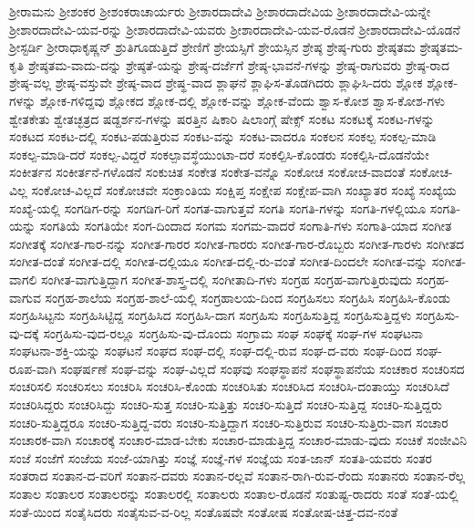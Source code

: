 {ಶ್ರೀರಾಮನು
ಶ್ರೀಶಂಕರ
ಶ್ರೀಶಂಕರಾಚಾರ್ಯರು
ಶ್ರೀಶಾರದಾದೇವಿ
ಶ್ರೀಶಾರದಾದೇವಿಯ
ಶ್ರೀಶಾರದಾದೇವಿ-ಯನ್ನೇ
ಶ್ರೀಶಾರದಾದೇವಿ-ಯವ-ರನ್ನು
ಶ್ರೀಶಾರದಾದೇವಿ-ಯವರು
ಶ್ರೀಶಾರದಾದೇವಿ-ಯವ-ರೊಡನೆ
ಶ್ರೀಶಾರದಾದೇವಿ-ಯೊಡನೆ
ಶ್ರೀಸ್ಟರ್ಡಿ
ಶ್ರೀರಾಧಾಕೃಷ್ಣನ್
ಶ್ರುತಿಗೂಡುತ್ತಿದೆ
ಶ್ರೇಣಿಗೆ
ಶ್ರೇಯಸ್ಸಿಗೆ
ಶ್ರೇಯಸ್ಸಿನ
ಶ್ರೇಷ್ಠ
ಶ್ರೇಷ್ಠ-ಗುರು
ಶ್ರೇಷ್ಠತಮ
ಶ್ರೇಷ್ಠತಮ-ಕೃತಿ
ಶ್ರೇಷ್ಠತಮ-ವಾದು-ದನ್ನು
ಶ್ರೇಷ್ಠತೆ-ಯನ್ನು
ಶ್ರೇಷ್ಠ-ದರ್ಜೆಗೆ
ಶ್ರೇಷ್ಠ-ಭಾವನೆ-ಗಳನ್ನು
ಶ್ರೇಷ್ಠ-ರಾಗುವರು
ಶ್ರೇಷ್ಠ-ರಾದ
ಶ್ರೇಷ್ಠ-ವಲ್ಲ
ಶ್ರೇಷ್ಠ-ವಸ್ತುವೇ
ಶ್ರೇಷ್ಠ-ವಾದ
ಶ್ರೇಷ್ಥ-ವಾದ
ಶ್ಲಾಘನೆ
ಶ್ಲಾಘಿಸ-ತೊಡಗಿದರು
ಶ್ಲಾಘಿಸಿ-ದರು
ಶ್ಲೋಕ
ಶ್ಲೋಕ-ಗಳನ್ನು
ಶ್ಲೋಕ-ಗಳಿದ್ದವು
ಶ್ಲೋಕದ
ಶ್ಲೋಕ-ದಲ್ಲಿ
ಶ್ಲೋಕ-ವನ್ನು
ಶ್ಲೋಕ-ವೆಂದು
ಶ್ವಾಸ-ಕೋಶ
ಶ್ವಾಸ-ಕೋಶ-ಗಳು
ಶ್ವೇತಕೇತು
ಶ್ವೇತಚ್ಛತ್ರದ
ಷಡ್ದರ್ಶನ-ಗಳನ್ನು
ಷರತ್ತಿನ
ಷಿಕಾರಿ
ಷಿಲಾಂಗ್ಗೆ
ಷೇಕ್ಸ್
ಸಂಕಟ
ಸಂಕಟಕ್ಕೆ
ಸಂಕಟ-ಗಳನ್ನು
ಸಂಕಟದ
ಸಂಕಟ-ದಲ್ಲಿ
ಸಂಕಟ-ಪಡುತ್ತಿರುವ
ಸಂಕಟ-ವನ್ನು
ಸಂಕಟ-ವಾದರೂ
ಸಂಕಲನ
ಸಂಕಲ್ಪ
ಸಂಕಲ್ಪ-ಮಾಡಿ
ಸಂಕಲ್ಪ-ಮಾಡಿ-ದರೆ
ಸಂಕಲ್ಪ-ವಿದ್ದರೆ
ಸಂಕಲ್ಪಾವಸ್ಥೆಯುಂಟಾ-ದರೆ
ಸಂಕಲ್ಪಿಸಿ-ಕೊಂಡರು
ಸಂಕಲ್ಪಿಸಿ-ದೊಡನೆಯೇ
ಸಂಕೀರ್ತನ
ಸಂಕೀರ್ತನೆ-ಗಳೊಡನೆ
ಸಂಕುಚಿತ
ಸಂಕೇತ
ಸಂಕೇತ-ವನ್ನೊ
ಸಂಕೋಚ
ಸಂಕೋಚ-ವಾದಂತೆ
ಸಂಕೋಚ-ವಿಲ್ಲ
ಸಂಕೋಚ-ವಿಲ್ಲದೆ
ಸಂಕೋಚವೇ
ಸಂಕ್ರಾಂತಿಯ
ಸಂಕ್ಷಿಪ್ತ
ಸಂಕ್ಷೇಪ
ಸಂಕ್ಷೇಪ-ವಾಗಿ
ಸಂಖ್ಯಾತರ
ಸಂಖ್ಯೆ
ಸಂಖ್ಯೆಯ
ಸಂಖ್ಯೆ-ಯಲ್ಲಿ
ಸಂಗಡಿಗ-ರನ್ನು
ಸಂಗಡಿಗ-ರಿಗೆ
ಸಂಗತ-ವಾಗುತ್ತವೆ
ಸಂಗತಿ
ಸಂಗತಿ-ಗಳನ್ನು
ಸಂಗತಿ-ಗಳಲ್ಲಿಯೂ
ಸಂಗತಿ-ಯನ್ನು
ಸಂಗತಿಯೆ
ಸಂಗತಿಯೇ
ಸಂಗ-ದಿಂದಾದ
ಸಂಗಮ
ಸಂಗಮ-ವಾದರೆ
ಸಂಗಾತಿ-ಗಳು
ಸಂಗಾತಿ-ಯಾದ
ಸಂಗೀತ
ಸಂಗೀತಕ್ಕೆ
ಸಂಗೀತ-ಗಾರ-ನನ್ನು
ಸಂಗೀತ-ಗಾರರ
ಸಂಗೀತ-ಗಾರರು
ಸಂಗೀತ-ಗಾರ-ರೊಬ್ಬರು
ಸಂಗೀತ-ಗಾರಳು
ಸಂಗೀತದ
ಸಂಗೀತ-ದಂತೆ
ಸಂಗೀತ-ದಲ್ಲಿ
ಸಂಗೀತ-ದಲ್ಲಿಯೂ
ಸಂಗೀತ-ದಲ್ಲಿ-ರು-ವಂತೆ
ಸಂಗೀತ-ದಿಂದಲೇ
ಸಂಗೀತ-ವನ್ನು
ಸಂಗೀತ-ವಾಗಲಿ
ಸಂಗೀತ-ವಾಗುತ್ತಿದ್ದಾಗ
ಸಂಗೀತ-ಶಾಸ್ತ್ರ-ದಲ್ಲಿ
ಸಂಗೀತಾದಿ-ಗಳು
ಸಂಗ್ರಹ
ಸಂಗ್ರಹ-ವಾಗುತ್ತಿರುವುದು
ಸಂಗ್ರಹ-ವಾಗುವ
ಸಂಗ್ರಹ-ಶಾಲೆಯ
ಸಂಗ್ರಹ-ಶಾಲೆ-ಯಲ್ಲಿ
ಸಂಗ್ರಹಾಲಯ-ದಿಂದ
ಸಂಗ್ರಹಿಸಲು
ಸಂಗ್ರಹಿಸಿ
ಸಂಗ್ರಹಿಸಿ-ಕೊಂಡು
ಸಂಗ್ರಹಿಸಿಟ್ಟನು
ಸಂಗ್ರಹಿಸಿಟ್ಟಿದ್ದ
ಸಂಗ್ರಹಿಸಿದ
ಸಂಗ್ರಹಿಸಿ-ದಾಗ
ಸಂಗ್ರಹಿಸು
ಸಂಗ್ರಹಿಸುತ್ತಿದ್ದ
ಸಂಗ್ರಹಿಸುತ್ತಿದ್ದಳು
ಸಂಗ್ರಹಿಸು-ವು-ದಕ್ಕೆ
ಸಂಗ್ರಹಿಸು-ವುದ-ರಲ್ಲೂ
ಸಂಗ್ರಹಿಸು-ವು-ದೊಂದು
ಸಂಗ್ರಾಮ
ಸಂಘ
ಸಂಘಕ್ಕೆ
ಸಂಘ-ಗಳ
ಸಂಘಟನಾ
ಸಂಘಟನಾ-ಶಕ್ತಿ-ಯನ್ನು
ಸಂಘಟನೆ
ಸಂಘದ
ಸಂಘ-ದಲ್ಲಿ
ಸಂಘ-ದಲ್ಲಿ-ರುವ
ಸಂಘ-ದ-ವರು
ಸಂಘ-ದಿಂದ
ಸಂಘ-ರೂಪ-ವಾಗಿ
ಸಂಘರ್ಷಣೆ
ಸಂಘ-ವನ್ನು
ಸಂಘ-ವಿಲ್ಲದೆ
ಸಂಘವು
ಸಂಘಸ್ಥಾಪನೆ
ಸಂಘಸ್ಥಾಪನೆಯ
ಸಂಚಕಾರ
ಸಂಚರಿಸದ
ಸಂಚರಿಸಲಿ
ಸಂಚರಿಸಲು
ಸಂಚರಿಸಿ
ಸಂಚರಿಸಿ-ಕೊಂಡು
ಸಂಚರಿಸಿತು
ಸಂಚರಿಸಿದ
ಸಂಚರಿಸಿ-ದಂತಾಯ್ತು
ಸಂಚರಿಸಿದೆ
ಸಂಚರಿಸಿದ್ದರು
ಸಂಚರಿಸಿದ್ದು
ಸಂಚರಿ-ಸುತ್ತ
ಸಂಚರಿ-ಸುತ್ತಿತ್ತು
ಸಂಚರಿ-ಸುತ್ತಿದೆ
ಸಂಚರಿ-ಸುತ್ತಿದ್ದ
ಸಂಚರಿ-ಸುತ್ತಿದ್ದರು
ಸಂಚರಿ-ಸುತ್ತಿದ್ದರೂ
ಸಂಚರಿ-ಸುತ್ತಿದ್ದ-ವರು
ಸಂಚರಿ-ಸುತ್ತಿದ್ದಾಗ
ಸಂಚರಿ-ಸುತ್ತಿರುವ
ಸಂಚರಿ-ಸುತ್ತಿರು-ವಾಗ
ಸಂಚಾರ
ಸಂಚಾರಕ-ವಾಗಿ
ಸಂಚಾರಕ್ಕೆ
ಸಂಚಾರ-ಮಾಡ-ಬೇಕು
ಸಂಚಾರ-ಮಾಡುತ್ತಿದ್ದ
ಸಂಚಾರ-ಮಾಡು-ವುದು
ಸಂಚಿಕೆ
ಸಂಜೀವಿನಿ
ಸಂಜೆ
ಸಂಜೆಗೆ
ಸಂಜೆಯ
ಸಂಜೆ-ಯಾಗಿತ್ತು
ಸಂಜ್ಞೆ
ಸಂಜ್ಞೆ-ಗಳ
ಸಂಜ್ಞೆಯ
ಸಂತ-ಜಾನ್
ಸಂತತಿ-ಯವರು
ಸಂತರ
ಸಂತರಾದ
ಸಂತಾನ-ದ-ವರಿಗೆ
ಸಂತಾನ-ದವರು
ಸಂತಾನ-ರಲ್ಲವೆ
ಸಂತಾನ-ರಾಗಿ-ರುವ-ರೆಂದು
ಸಂತಾನರು
ಸಂತಾನ-ರೆಲ್ಲ
ಸಂತಾಲ
ಸಂತಾಲರ
ಸಂತಾಲರನ್ನು
ಸಂತಾಲರಲ್ಲಿ
ಸಂತಾಲರು
ಸಂತಾಲ-ರೊಡನೆ
ಸಂತುಷ್ಟ-ರಾದರು
ಸಂತೆ
ಸಂತೆ-ಯಲ್ಲಿ
ಸಂತೆ-ಯಿಂದ
ಸಂತೈಸಿದರು
ಸಂತೈಸುವ-ವ-ರಿಲ್ಲ
ಸಂತೊಷವೇ
ಸಂತೋಷ
ಸಂತೋಷ-ಚಿತ್ತ-ದವ-ನಂತೆ
}
